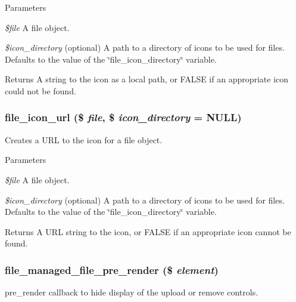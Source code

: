 \begin{DoxyParams}{Parameters}
\item[{\em \$file}]A file object. \item[{\em \$icon\_\-directory}](optional) A path to a directory of icons to be used for files. Defaults to the value of the \char`\"{}file\_\-icon\_\-directory\char`\"{} variable.\end{DoxyParams}
\begin{DoxyReturn}{Returns}
A string to the icon as a local path, or FALSE if an appropriate icon could not be found. 
\end{DoxyReturn}
\hypertarget{file_8module_ad4fcd7650077b4fa3d08812c30806ed5}{
\subsubsection[{file\_\-icon\_\-url}]{\setlength{\rightskip}{0pt plus 5cm}file\_\-icon\_\-url (\$ {\em file}, \/  \$ {\em icon\_\-directory} = {\ttfamily NULL})}}
\label{file_8module_ad4fcd7650077b4fa3d08812c30806ed5}
Creates a URL to the icon for a file object.


\begin{DoxyParams}{Parameters}
\item[{\em \$file}]A file object. \item[{\em \$icon\_\-directory}](optional) A path to a directory of icons to be used for files. Defaults to the value of the \char`\"{}file\_\-icon\_\-directory\char`\"{} variable.\end{DoxyParams}
\begin{DoxyReturn}{Returns}
A URL string to the icon, or FALSE if an appropriate icon cannot be found. 
\end{DoxyReturn}
\hypertarget{file_8module_a0e548196b69cc1d2354b468348d514cf}{
\subsubsection[{file\_\-managed\_\-file\_\-pre\_\-render}]{\setlength{\rightskip}{0pt plus 5cm}file\_\-managed\_\-file\_\-pre\_\-render (\$ {\em element})}}
\label{file_8module_a0e548196b69cc1d2354b468348d514cf}
pre\_\-render callback to hide display of the upload or remove controls.


